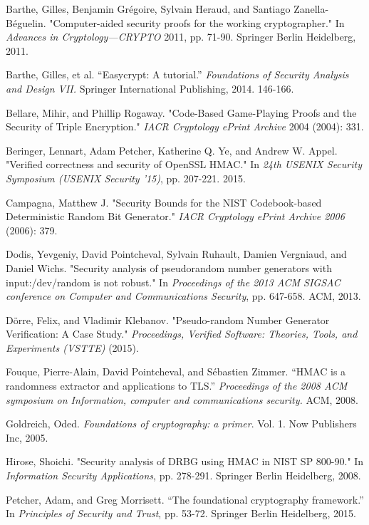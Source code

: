 \documentclass[12pt,lot, lof]{puthesis}
\begin{document}
{\begin{thebibliography}{99}
Barthe, Gilles, Benjamin Gr{\'e}goire, Sylvain Heraud, and Santiago Zanella-B{\'e}guelin. "Computer-aided security proofs for the working cryptographer." In \emph{Advances in Cryptology---CRYPTO} 2011, pp. 71-90. Springer Berlin Heidelberg, 2011.

Barthe, Gilles, et al. ``Easycrypt: A tutorial.'' \emph{Foundations of Security Analysis and Design VII.} Springer International Publishing, 2014. 146-166.

Bellare, Mihir, and Phillip Rogaway. "Code-Based Game-Playing Proofs and the Security of Triple Encryption." \emph{IACR Cryptology ePrint Archive} 2004 (2004): 331.

Beringer, Lennart, Adam Petcher, Katherine Q. Ye, and Andrew W. Appel. "Verified correctness and security of OpenSSL HMAC." In \emph{24th USENIX Security Symposium (USENIX Security '15)}, pp. 207-221. 2015.

Campagna, Matthew J. "Security Bounds for the NIST Codebook-based Deterministic Random Bit Generator." \emph{IACR Cryptology ePrint Archive 2006} (2006): 379.

Dodis, Yevgeniy, David Pointcheval, Sylvain Ruhault, Damien Vergniaud, and Daniel Wichs. "Security analysis of pseudorandom number generators with input:/dev/random is not robust." In \emph{Proceedings of the 2013 ACM SIGSAC conference on Computer and Communications Security}, pp. 647-658. ACM, 2013.

D{\"o}rre, Felix, and Vladimir Klebanov. "Pseudo-random Number Generator Verification: A Case Study." \emph{Proceedings, Verified Software: Theories, Tools, and Experiments (VSTTE)} (2015).

Fouque, Pierre-Alain, David Pointcheval, and Sébastien Zimmer. ``HMAC is a randomness extractor and applications to TLS.'' \emph{Proceedings of the 2008 ACM symposium on Information, computer and communications security.} ACM, 2008.

Goldreich, Oded. \emph{Foundations of cryptography: a primer}. Vol. 1. Now Publishers Inc, 2005.

Hirose, Shoichi. "Security analysis of DRBG using HMAC in NIST SP 800-90." In \emph{Information Security Applications}, pp. 278-291. Springer Berlin Heidelberg, 2008.

Petcher, Adam, and Greg Morrisett. ``The foundational cryptography framework.'' In \emph{Principles of Security and Trust}, pp. 53-72. Springer Berlin Heidelberg, 2015.


\end{thebibliography}}
\end{document}
